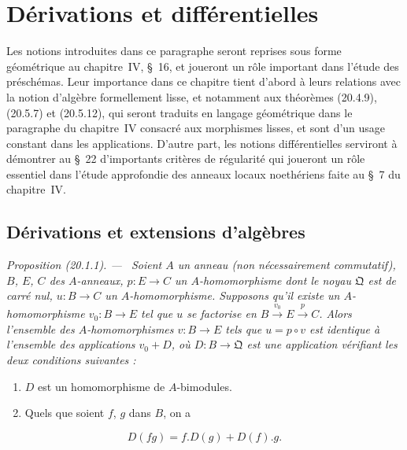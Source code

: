 \documentclass[10pt,oneside]{book}
\makeatletter
\newcommand{\setmanualcurrentlabel}[1]{\def\@currentlabel{#1}}
\newcommand{\oldpage}[2][]{%
  \setcounter{footnote}{0}%
  \marginpar{\scriptsize\textbf{#1}~|~#2}\ignorespaces}
\newenvironment{proposition}[1][]{%
  \setmanualcurrentlabel{#1}\par\medskip\noindent\itshape Proposition (#1). ---\ }{\par}
\makeatother
\begin{document}

%
\section{Dérivations et différentielles}
\label{section:0.20-fr}
\label{0.20-fr}

Les notions introduites dans ce paragraphe seront reprises sous forme
géométrique au chapitre~IV, §~16, et joueront un rôle important dans l'étude
des préschémas. Leur importance dans ce chapitre tient d'abord à leurs
relations avec la notion d'algèbre formellement lisse, et notamment aux
théorèmes (20.4.9), (20.5.7) et (20.5.12), qui seront traduits en langage
géométrique dans le paragraphe du chapitre~IV consacré aux morphismes lisses,
et sont d'un usage constant dans les applications. D'autre part, les notions
différentielles serviront à démontrer au §~22 d'importants critères de
régularité qui joueront un rôle essentiel dans l'étude approfondie des anneaux
locaux noethériens faite au §~7 du chapitre~IV.

\subsection{Dérivations et extensions d'algèbres}
\label{subsection:0.20.1-fr}

\oldpage[0\textsubscript{IV-1}]{117}
\begin{proposition}[20.1.1]
\label{0.20.1.1-fr}
Soient $A$ un anneau (non nécessairement commutatif), $B$, $E$, $C$ des
$A$-anneaux, $p:E\to C$ un $A$-homomorphisme dont le noyau $\mathfrak{Q}$
est de carré nul, $u:B\to C$ un $A$-homomorphisme. Supposons qu'il existe
un $A$-homomorphisme $v_0:B\to E$ tel que $u$ se factorise en
$B\xrightarrow{v_0}E\xrightarrow{p}C$. Alors l'ensemble des
$A$-homomorphismes $v:B\to E$ tels que $u=p\circ v$ est identique à
l'ensemble des applications $v_0+D$, où $D:B\to\mathfrak{Q}$ est une
application vérifiant les deux conditions suivantes :
\begin{enumerate}
  \item[\rm(i)] $D$ est un homomorphisme de $A$-bimodules.
  \item[\rm(ii)] Quels que soient $f$, $g$ dans $B$, on a
\end{enumerate}
\begin{equation}
\tag{20.1.1.1}
\label{0.20.1.1.1-fr}
  D(fg)=f.D(g)+D(f).g.
\end{equation}
\end{proposition}
\end{document}
